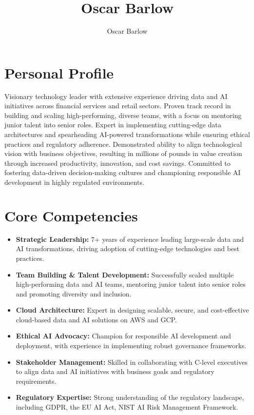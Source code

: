 \documentclass[a4paper]{scrartcl}
\author{Oscar Barlow}
\title{Oscar Barlow}
\date{}
\begin{document}
\maketitle

\section*{Personal Profile}
 { %
  \setlength{\parskip}{6pt plus 2pt minus 1pt}
  Visionary technology leader with extensive experience driving data and AI initiatives across financial services and retail sectors. Proven track record in building and scaling high-performing, diverse teams, with a focus on mentoring junior talent into senior roles. Expert in implementing cutting-edge data architectures and spearheading AI-powered transformations while ensuring ethical practices and regulatory adherence. Demonstrated ability to align technological vision with business objectives, resulting in millions of pounds in value creation through increased productivity, innovation, and cost savings. Committed to fostering data-driven decision-making cultures and championing responsible AI development in highly regulated environments.
 } %

\section*{Core Competencies}
\begin{itemize}
	\item \textbf{Strategic Leadership:} 7+ years of experience leading large-scale data and AI transformations, driving adoption of cutting-edge technologies and best practices.
	\item \textbf{Team Building \& Talent Development:} Successfully scaled multiple high-performing data and AI teams, mentoring junior talent into senior roles and promoting diversity and inclusion.
	\item \textbf{Cloud Architecture:} Expert in designing scalable, secure, and cost-effective cloud-based data and AI solutions on AWS and GCP.
	\item \textbf{Ethical AI Advocacy:} Champion for responsible AI development and deployment, with experience in implementing robust governance frameworks.
	\item \textbf{Stakeholder Management:} Skilled in collaborating with C-level executives to align data and AI initiatives with business goals and regulatory requirements.
	\item \textbf{Regulatory Expertise:} Strong understanding of the regulatory landscape, including GDPR, the EU AI Act, NIST AI Risk Management Framework.
\end{itemize}
\end{document}
